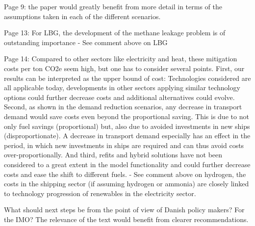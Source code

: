 Page 9: the paper would greatly benefit from more detail in terms of the assumptions taken in each of the different scenarios. 

Page 13: For LBG, the development of the methane leakage problem is of outstanding importance
-	See comment above on LBG

Page 14: Compared to other sectors like electricity and heat, these mitigation costs per ton CO2e seem high, but one has to consider several points. First, our results can be interpreted as the upper bound of cost: Technologies considered are all applicable today, developments in other sectors applying similar technology options could further decrease costs and additional alternatives could evolve. Second, as shown in the demand reduction scenarios, any decrease in transport demand would save costs even beyond the proportional saving. This is due to not only fuel savings (proportional) but, also due to avoided investments in new ships (disproportionate). A decrease in transport demand especially has an effect in the period, in which new investments in ships are required and can thus avoid costs over-proportionally. And third, refits and hybrid solutions have not been considered to a great extent in the model functionality and could further decrease costs and ease the shift to different fuels. 
-	See comment above on hydrogen, the costs in the shipping sector (if assuming hydrogen or ammonia) are closely linked to technology progression of renewables in the electricity sector. 

What should next steps be from the point of view of Danish policy makers? For the IMO? The relevance of the text would benefit from clearer recommendations. 
